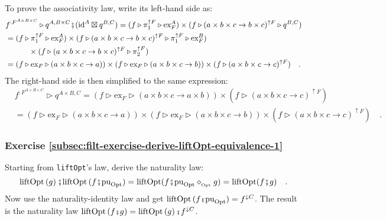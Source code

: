 To prove the associativity law, write its left-hand side as:
\begin{align*}
 & f^{:F^{A\times B\times C}}\triangleright q^{A,B\times C}\bef(\text{id}^{A}\boxtimes q^{B,C})=(f\triangleright\pi_{1}^{\uparrow F}\triangleright\text{ex}_{F}^{A})\times(f\triangleright(a\times b\times c\rightarrow b\times c)^{\uparrow F}\triangleright q^{B,C})\\
 & =(f\triangleright\pi_{1}^{\uparrow F}\triangleright\text{ex}_{F}^{A})\times(f\triangleright(a\times b\times c\rightarrow b\times c)^{\uparrow F}\triangleright\pi_{1}^{\uparrow F}\triangleright\text{ex}_{F}^{B})\\
 & \quad\quad\quad\times(f\triangleright(a\times b\times c\rightarrow b\times c)^{\uparrow F}\triangleright\pi_{2}^{\uparrow F})\\
 & =\left(f\triangleright\text{ex}_{F}\triangleright(a\times b\times c\rightarrow a)\right)\times\left(f\triangleright\text{ex}_{F}\triangleright(a\times b\times c\rightarrow b)\right)\times(f\triangleright(a\times b\times c\rightarrow c)^{\uparrow F})\quad.
\end{align*}
The right-hand side is then simplified to the same expression:
\begin{align*}
 & f^{:F^{A\times B\times C}}\triangleright q^{A\times B,C}=(f\triangleright\text{ex}_{F}\triangleright(a\times b\times c\rightarrow a\times b))\times(f\triangleright(a\times b\times c\rightarrow c)^{\uparrow F})\\
 & =\left(f\triangleright\text{ex}_{F}\triangleright(a\times b\times c\rightarrow a)\right)\times\left(f\triangleright\text{ex}_{F}\triangleright(a\times b\times c\rightarrow b)\right)\times(f\triangleright(a\times b\times c\rightarrow c)^{\uparrow F})\quad.
\end{align*}



\subsubsection*{Exercise \ref{subsec:filt-exercise-derive-liftOpt-equivalence-1}}

Starting from \lstinline!liftOpt!\textsf{'}s law, derive the naturality law:
\[
\text{liftOpt}\left(g\right)\bef\text{liftOpt}\,(f\bef\text{pu}_{\text{Opt}})=\text{liftOpt}(f\bef\text{pu}_{\text{Opt}}\diamond_{_{\text{Opt}}}g)=\text{liftOpt}(f\bef g)\quad.
\]
Now use the naturality-identity law and get $\text{liftOpt}\,(f\bef\text{pu}_{\text{Opt}})=f^{\downarrow C}$.
The result is the naturality law $\text{liftOpt}\left(f\bef g\right)=\text{liftOpt}\left(g\right)\bef f^{\downarrow C}$.


